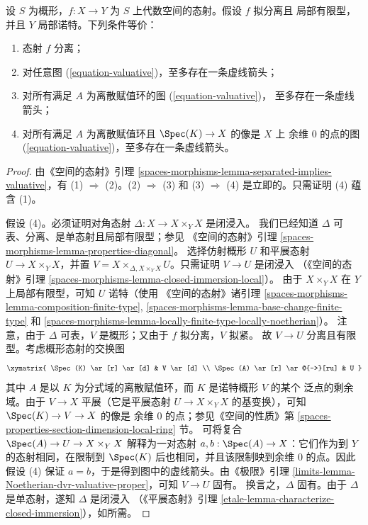 \begin{lemma}
\label{lemma-Noetherian-dvr-valuative-separation}
设 $S$ 为概形，$f : X \to Y$ 为 $S$ 上代数空间的态射。假设 $f$ 拟分离且
局部有限型，并且 $Y$ 局部诺特。下列条件等价：
\begin{enumerate}
\item 态射 $f$ 分离；
\item 对任意图 (\ref{equation-valuative})，至多存在一条虚线箭头；
\item 对所有满足 $A$ 为离散赋值环的图 (\ref{equation-valuative})，
至多存在一条虚线箭头；
\item 对所有满足 $A$ 为离散赋值环且 $\Spec(K) \to X$ 的像是 $X$ 上
余维 $0$ 的点的图 (\ref{equation-valuative})，至多存在一条虚线箭头。
\end{enumerate}
\end{lemma}

\begin{proof}
由《空间的态射》引理
\ref{spaces-morphisms-lemma-separated-implies-valuative}，有
(1) $\Rightarrow$ (2)。(2) $\Rightarrow$ (3) 和
(3) $\Rightarrow$ (4) 是立即的。只需证明 (4) 蕴含 (1)。

\medskip\noindent
假设 (4)。必须证明对角态射 $\Delta : X \to X \times_Y X$ 是闭浸入。
我们已经知道 $\Delta$ 可表、分离、是单态射且局部有限型；参见
《空间的态射》引理
\ref{spaces-morphisms-lemma-properties-diagonal}。
选择仿射概形 $U$ 和平展态射 $U \to X \times_Y X$，并置
$V = X \times_{\Delta, X \times_Y X} U$。只需证明 $V \to U$ 是闭浸入
（《空间的态射》引理
\ref{spaces-morphisms-lemma-closed-immersion-local}）。
由于 $X \times_Y X$ 在 $Y$ 上局部有限型，可知 $U$ 诺特（使用
《空间的态射》诸引理
\ref{spaces-morphisms-lemma-composition-finite-type},
\ref{spaces-morphisms-lemma-base-change-finite-type} 和
\ref{spaces-morphisms-lemma-locally-finite-type-locally-noetherian}）。
注意，由于 $\Delta$ 可表，$V$ 是概形；又由于 $f$ 拟分离，$V$ 拟紧。
故 $V \to U$ 分离且有限型。考虑概形态射的交换图
$$
\xymatrix{
\Spec(K) \ar[r] \ar[d] & V \ar[d] \\
\Spec(A) \ar[r] \ar@{-->}[ru] & U
}
$$
其中 $A$ 是以 $K$ 为分式域的离散赋值环，而 $K$ 是诺特概形 $V$ 的某个
泛点的剩余域。由于 $V \to X$ 平展（它是平展态射
$U \to X \times_Y X$ 的基变换），可知 $\Spec(K) \to V \to X$ 的像是
余维 $0$ 的点；参见《空间的性质》第
\ref{spaces-properties-section-dimension-local-ring} 节。
可将复合 $\Spec(A) \to U \to X \times_Y X$ 解释为一对态射
$a, b : \Spec(A) \to X$：它们作为到 $Y$ 的态射相同，在限制到
$\Spec(K)$ 后也相同，并且该限制映到余维 $0$ 的点。因此假设 (4) 保证
$a = b$，于是得到图中的虚线箭头。由《极限》引理
\ref{limits-lemma-Noetherian-dvr-valuative-proper}，可知 $V \to U$ 固有。
换言之，$\Delta$ 固有。由于 $\Delta$ 是单态射，遂知 $\Delta$ 是闭浸入
（《平展态射》引理 \ref{etale-lemma-characterize-closed-immersion}），如所需。
\end{proof}

